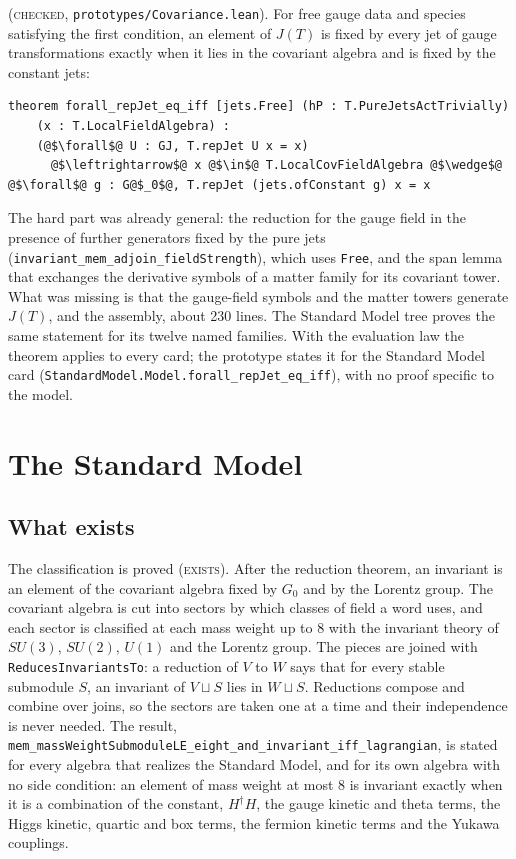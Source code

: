 \documentclass[11pt,a4paper]{article}
\makeatletter
\newcommand{\lean}[1]{{\footnotesize\upshape\ttfamily\nolinkurl{#1}}}
\newcommand{\file}[1]{{\small\ttfamily\nolinkurl{#1}}}
\newcommand{\stE}{\textsc{exists}}
\newcommand{\stC}{\textsc{checked}}
\renewcommand\paragraph{\@startsection{paragraph}{4}{\z@}{1.7ex \@plus .6ex \@minus .2ex}{-0.8em}{\normalfont\normalsize\bfseries}}
\makeatother
\begin{document}
\paragraph{The reduction theorem} (\stC, \file{prototypes/Covariance.lean}). For free gauge data and species satisfying the first condition, an element of $J(T)$ is fixed by every jet of gauge transformations exactly when it lies in the covariant algebra and is fixed by the constant jets:
\begin{lstlisting}
theorem forall_repJet_eq_iff [jets.Free] (hP : T.PureJetsActTrivially)
    (x : T.LocalFieldAlgebra) :
    (@$\forall$@ U : GJ, T.repJet U x = x)
      @$\leftrightarrow$@ x @$\in$@ T.LocalCovFieldAlgebra @$\wedge$@ @$\forall$@ g : G@$_0$@, T.repJet (jets.ofConstant g) x = x
\end{lstlisting}
The hard part was already general: the reduction for the gauge field in the presence of further generators fixed by the pure jets (\lean{invariant_mem_adjoin_fieldStrength}), which uses \lean{Free}, and the span lemma that exchanges the derivative symbols of a matter family for its covariant tower. What was missing is that the gauge-field symbols and the matter towers generate $J(T)$, and the assembly, about 230 lines. The Standard Model tree proves the same statement for its twelve named families. With the evaluation law the theorem applies to every card; the prototype states it for the Standard Model card (\lean{StandardModel.Model.forall_repJet_eq_iff}), with no proof specific to the model.

\section{The Standard Model}\label{sec:sm}

\subsection{What exists}

The classification is proved (\stE). After the reduction theorem, an invariant is an element of the covariant algebra fixed by $G_0$ and by the Lorentz group. The covariant algebra is cut into sectors by which classes of field a word uses, and each sector is classified at each mass weight up to 8 with the invariant theory of $SU(3)$, $SU(2)$, $U(1)$ and the Lorentz group. The pieces are joined with \lean{ReducesInvariantsTo}: a reduction of $V$ to $W$ says that for every stable submodule $S$, an invariant of $V\sqcup S$ lies in $W\sqcup S$. Reductions compose and combine over joins, so the sectors are taken one at a time and their independence is never needed. The result, \lean{mem_massWeightSubmoduleLE_eight_and_invariant_iff_lagrangian}, is stated for every algebra that realizes the Standard Model, and for its own algebra with no side condition: an element of mass weight at most 8 is invariant exactly when it is a combination of the constant, $H^\dagger H$, the gauge kinetic and theta terms, the Higgs kinetic, quartic and box terms, the fermion kinetic terms and the Yukawa couplings.
\end{document}
